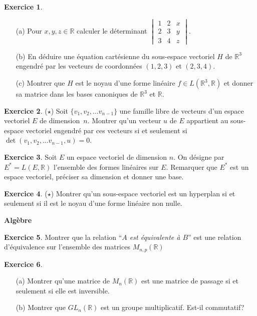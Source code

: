 \documentclass[11pt,a4paper]{article}
\theoremstyle{definition}
\newtheorem{exo}{Exercice}
\newcommand{\R}{\mathbb{R}}
\begin{document}
\begin{exo}
\begin{itemize}
\item[(a)] Pour $x, y, z \in \R$ calculer le déterminant 
$\begin{vmatrix}
1 & 2 & x\\
2 & 3 & y\\
3 & 4 & z
\end{vmatrix}$. 
\item[(b)] En déduire une équation cartésienne du sous-espace vectoriel $H$ de $\R^3$ engendré par les vecteurs de coordonnées 
$(1,2,3)$ et $(2,3,4)$.
\item[(c)] Montrer que $H$ est le noyau d'une forme linéaire $f \in L(\R^3,\R)$ et donner sa matrice dans les bases canoniques de $\R^3$ et $\R$.
   \end{itemize}
\end{exo}

\begin{exo}($\star$)
Soit $\{v_1, v_2, \ldots v_{n-1}\}$ une famille libre de vecteurs d'un espace vectoriel $E$ de dimension~$n$.
Montrer qu'un vecteur $u$ de $E$ appartient au sous-espace vectoriel engendré par ces vecteurs si et seulement si $\det(v_1, v_2, \ldots v_{n-1},u) = 0$.
\end{exo}

\begin{exo}
Soit $E$ un espace vectoriel de dimension $n$. On désigne par $E^*=L(E,\R)$ l'ensemble des formes linéaires sur $E$. Remarquer que $E^*$ est un espace vectoriel, préciser sa dimension et donner une base.
\end{exo}


\begin{exo}($\star$)
Montrer qu'un sous-espace vectoriel est un hyperplan si et seulement si il est le noyau d'une forme linéaire non nulle.
\end{exo}


{\bfseries
Algèbre
}
\begin{exo}
Montrer que la relation ``\textit{$A$ est équivalente à $B$}'' est une relation d'équivalence sur l'ensemble des matrices
$M_{n,p}(\R)$ 
\end{exo}

\begin{exo}


\begin{itemize}
\item[\phantom{()}]
\item[(a)] Montrer qu'une matrice de $M_n(\R)$ est une matrice de passage si et seulement si elle est inversible.
\item[(b)] Montrer que $GL_n(\R)$ est un groupe multiplicatif. Est-il commutatif?
   \end{itemize}
\end{exo}
\end{document}
